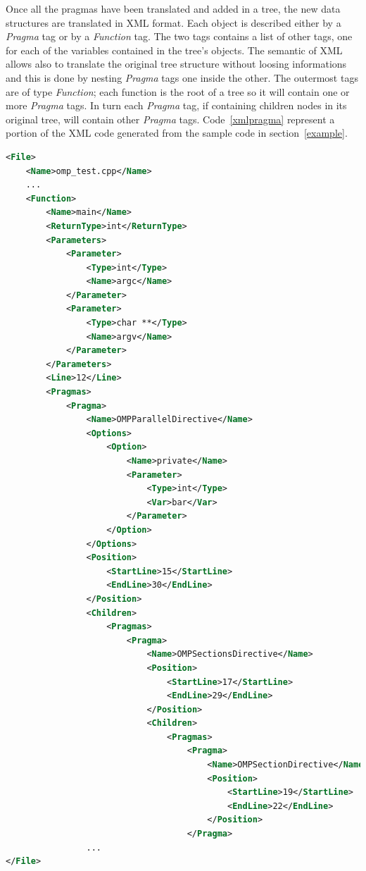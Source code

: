 \documentclass[a4paper,12pt,oneside]{book}
\begin{document}
Once all the pragmas have been translated and added in a tree, the new data structures are translated in XML format. Each object is described either by a \emph{Pragma} tag or by a \emph{Function} tag. The two tags contains a list of other tags, one for  each of the variables contained in the tree’s objects. The semantic of XML allows also to translate the original tree structure without loosing informations and this is done by nesting \emph{Pragma} tags one inside the other. The outermost tags are of type \emph{Function}; each function is the root of a tree so it will contain one or more \emph{Pragma} tags. In turn each \emph{Pragma} tag, if containing children nodes in its original tree, will contain other \emph{Pragma} tags. Code~\ref{xmlpragma} represent a portion of the XML code generated from the sample code in section~\ref{example}.

\begin{lstlisting}[language=XML, caption=XML file of the pragma structure of Code~\ref{code}., label=xmlpragma]
<File>
    <Name>omp_test.cpp</Name>    
    ...
    <Function>
        <Name>main</Name>
        <ReturnType>int</ReturnType>
        <Parameters>
            <Parameter>
                <Type>int</Type>
                <Name>argc</Name>
            </Parameter>
            <Parameter>
                <Type>char **</Type>
                <Name>argv</Name>
            </Parameter>
        </Parameters>
        <Line>12</Line>
        <Pragmas>
            <Pragma>
                <Name>OMPParallelDirective</Name>
                <Options>
                    <Option>
                        <Name>private</Name>
                        <Parameter>
                            <Type>int</Type>
                            <Var>bar</Var>
                        </Parameter>
                    </Option>
                </Options>
                <Position>
                    <StartLine>15</StartLine>
                    <EndLine>30</EndLine>
                </Position>
                <Children>
                    <Pragmas>
                        <Pragma>
                            <Name>OMPSectionsDirective</Name>
                            <Position>
                                <StartLine>17</StartLine>
                                <EndLine>29</EndLine>
                            </Position>
                            <Children>
                                <Pragmas>
                                    <Pragma>
                                        <Name>OMPSectionDirective</Name>
                                        <Position>
                                            <StartLine>19</StartLine>
                                            <EndLine>22</EndLine>
                                        </Position>
                                    </Pragma>
				...
</File>
\end{lstlisting}
\end{document}
